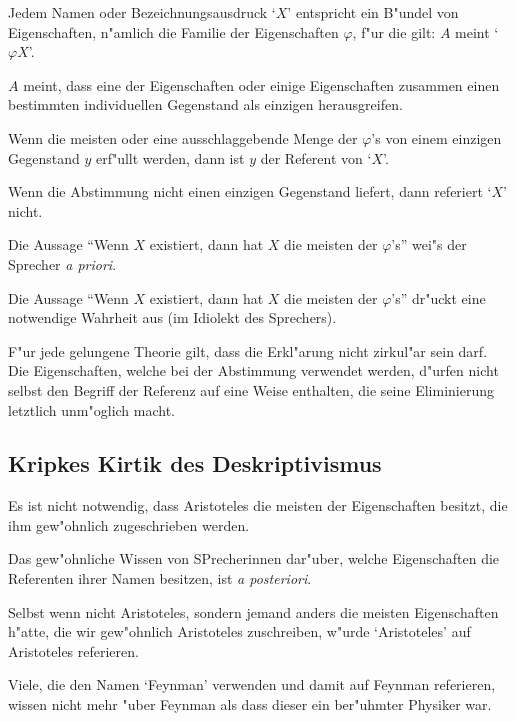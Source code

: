 \documentclass[emulatestandardclasses]{scrartcl}
\begin{document}
\begin{description}[leftmargin=!,labelwidth=\widthof{\bfseries (B)}]
    \item[(1)] Jedem Namen oder Bezeichnungsausdruck `$X$' entspricht ein B"undel von Eigenschaften, n"amlich die Familie der Eigenschaften $\varphi$, f"ur die gilt: $A$ meint `$\varphi X$'.
    \item[(2)] $A$ meint, dass eine der Eigenschaften oder einige Eigenschaften zusammen einen bestimmten individuellen Gegenstand als einzigen herausgreifen.
    \item[(3)] Wenn die meisten oder eine ausschlaggebende Menge der $\varphi$'s von einem einzigen Gegenstand $y$ erf"ullt werden, dann ist $y$ der Referent von `$X$'.
    \item[(4)] Wenn die Abstimmung nicht einen einzigen Gegenstand liefert, dann referiert `$X$' nicht.
    \item[(5)] Die Aussage "`Wenn $X$ existiert, dann hat $X$ die meisten der $\varphi$'s"' wei"s der Sprecher \emph{a priori}.
    \item[(6)] Die Aussage "`Wenn $X$ existiert, dann hat $X$ die meisten der $\varphi$'s"' dr"uckt eine notwendige Wahrheit aus (im Idiolekt des Sprechers).
    \item[(B)] F"ur jede gelungene Theorie gilt, dass die Erkl"arung nicht zirkul"ar sein darf. Die Eigenschaften, welche bei der Abstimmung verwendet werden, d"urfen nicht selbst den Begriff der Referenz auf eine Weise enthalten, die seine Eliminierung letztlich unm"oglich macht.
\end{description}

\subsection{Kripkes Kirtik des Deskriptivismus}

\begin{description}[leftmargin=!,labelwidth=\widthof{\bfseries (1)}]
    \item[(6) ist falsch] Es ist nicht notwendig, dass Aristoteles die meisten der Eigenschaften besitzt, die ihm gew"ohnlich zugeschrieben werden.
    \item[(5) ist falsch] Das gew"ohnliche Wissen von SPrecherinnen dar"uber, welche Eigenschaften die Referenten ihrer Namen besitzen, ist \emph{a posteriori}.
    \item[(3) ist falsch] Selbst wenn nicht Aristoteles, sondern jemand anders die meisten Eigenschaften h"atte, die wir gew"ohnlich Aristoteles zuschreiben, w"urde `Aristoteles' auf Aristoteles referieren.
    \item[(2) ist falsch] Viele, die den Namen `Feynman' verwenden und damit auf Feynman referieren, wissen nicht mehr "uber Feynman als dass dieser ein ber"uhmter Physiker war.
\end{description}
\end{document}
